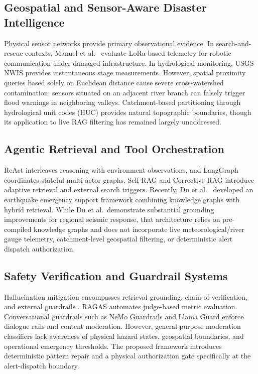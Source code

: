 \documentclass[conference]{IEEEtran}
\begin{document}
\subsection{Geospatial and Sensor-Aware Disaster Intelligence}
Physical sensor networks provide primary observational evidence. In search-and-rescue contexts, Manuel et al.\ \cite{manuel2024} evaluate LoRa-based telemetry for robotic communication under damaged infrastructure. In hydrological monitoring, USGS NWIS \cite{usgsnwis} provides instantaneous stage measurements. However, spatial proximity queries based solely on Euclidean distance cause severe cross-watershed contamination: sensors situated on an adjacent river branch can falsely trigger flood warnings in neighboring valleys. Catchment-based partitioning through hydrological unit codes (HUC) provides natural topographic boundaries, though its application to live RAG filtering has remained largely unaddressed.

\subsection{Agentic Retrieval and Tool Orchestration}
ReAct \cite{react} interleaves reasoning with environment observations, and LangGraph \cite{langgraph} coordinates stateful multi-actor graphs. Self-RAG \cite{selfrag} and Corrective RAG \cite{crag} introduce adaptive retrieval and external search triggers. Recently, Du et al.\ \cite{zhang2024} developed an earthquake emergency support framework combining knowledge graphs with hybrid retrieval. While Du et al.\ demonstrate substantial grounding improvements for regional seismic response, that architecture relies on pre-compiled knowledge graphs and does not incorporate live meteorological/river gauge telemetry, catchment-level geospatial filtering, or deterministic alert dispatch authorization.

\subsection{Safety Verification and Guardrail Systems}
Hallucination mitigation encompasses retrieval grounding, chain-of-verification, and external guardrails \cite{ji,yu2024}. RAGAS \cite{ragas} automates judge-based metric evaluation. Conversational guardrails such as NeMo Guardrails \cite{nemoguardrails} and Llama Guard \cite{inan2023} enforce dialogue rails and content moderation. However, general-purpose moderation classifiers lack awareness of physical hazard states, geospatial boundaries, and operational emergency thresholds. The proposed framework introduces deterministic pattern repair and a physical authorization gate specifically at the alert-dispatch boundary.
\end{document}
